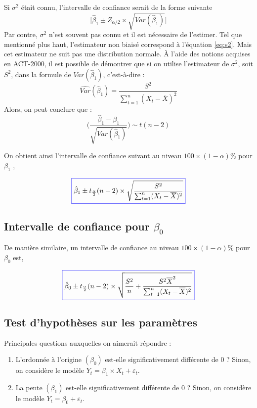 \documentclass[11pt,french]{report}
\begin{document}
Si $\sigma^2$ était connu, l'intervalle de confiance serait de la forme suivante 
$$
\bigg[\hat{\beta}_1\pm Z_{\alpha/2} \times \sqrt{Var(\hat{\beta}_1)}\bigg]
$$
Par contre, $\sigma^2$ n'est  souvent pas connu et il est nécessaire de l'estimer. Tel que mentionné plus haut, l'estimateur non biaisé correspond à l'équation \ref{eq:s2}. Mais cet estimateur ne suit pas une distribution normale. À l'aide des notions acquises en ACT-2000, il est possible de démontrer que si on utilise l'estimateur de $\sigma^2$, soit $S^2$, dans la formule de $Var(\hat{\beta}_1)$, c'est-à-dire :
$$
\widehat{Var}(\hat{\beta}_1) = \frac{S^2}{\sum_{t=1}^n (X_t - \overline{X})^2}
$$
Alors, on peut conclure que :
$$
\Bigg(\frac{\hat{\beta}_1 - \beta_1}{\sqrt{Var(\hat{\beta}_1)}}\Bigg) \sim t(n-2)
$$

On obtient ainsi l'intervalle de confiance suivant au niveau $100 \times (1 - \alpha)\%$ pour $\beta_1$ ,

\begin{equation}
\label{eq:intconfb1}
\color{blue}
\boxed{\color{black}
\hat{\beta}_1 \pm t_{\frac{\alpha}{2}}(n-2) \times \sqrt{\frac{S^2}{\sum_{t=1}^n (X_t - \overline{X})^2}}}
\end{equation}

\subsection{Intervalle de confiance pour $\beta_0$}
De manière similaire, un intervalle de confiance au niveau $100 \times (1 - \alpha)\%$ pour $\beta_0$ est,

\begin{equation}
\label{eq:intconfb0}
\color{blue}
\boxed{\color{black}
\hat{\beta}_0 \pm t_{\frac{\alpha}{2}}(n-2) \times \sqrt{\frac{S^2}{n} + \frac{S^2\overline{X}^2}{\sum_{t=1}^n (X_t - \overline{X})^2}}}
\end{equation}

\subsection{Test d'hypothèses sur les paramètres}
Principales questions auxquelles on aimerait répondre :
\begin{enumerate}
\item \label{hyp1} L'ordonnée à l'origine $(\beta_0)$ est-elle significativement différente de 0 ? \newline
Sinon, on considère le modèle $Y_t = \beta_1\times X_t + \varepsilon_t$.
\item  \label{hyp2} La pente $(\beta_1)$ est-elle significativement différente de 0 ? \newline
Sinon, on considère le modèle $Y_t = \beta_0 + \varepsilon_t$.
\end{enumerate}
\end{document}
